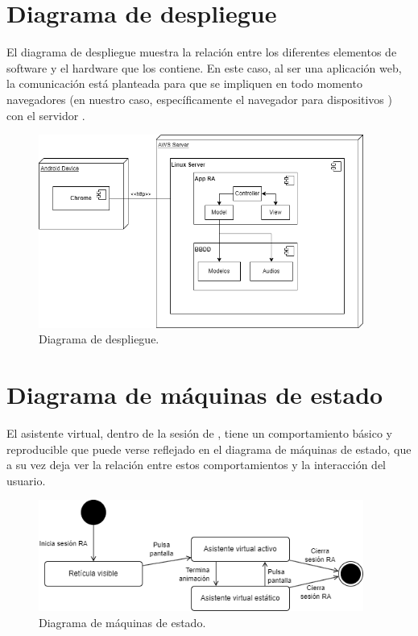 \documentclass{subfiles}
\begin{document}
        \section{Diagrama de despliegue}
        \label{sec:diagrama_de_despliegue}
        
El diagrama de despliegue muestra la relación entre los diferentes elementos de software y el hardware que los contiene. En este caso, al ser una aplicación web, la comunicación está planteada para que se impliquen en todo momento navegadores (en nuestro caso, específicamente el navegador \googlechrome para dispositivos \android) con el servidor \aws.

\begin{figure}[ht]
\centering
\includegraphics[width=0.95\textwidth]{img/analisis_diagrama_de_despliegue.png}
\caption{Diagrama de despliegue.}
\label{fig:analisis_diagrama_de_despliegue}
\end{figure}

\newpage
        \section{Diagrama de máquinas de estado}
        \label{sec:diagrama_de_maquinas_de_estado}
        
El asistente virtual, dentro de la sesión de \ra, tiene un comportamiento básico y reproducible que puede verse reflejado en el diagrama de máquinas de estado, que a su vez deja ver la relación entre estos comportamientos y la interacción del usuario.

\begin{figure}[ht]
\centering
\includegraphics[width=0.95\textwidth]{img/analisis_diagrama_maquinas_de_estado.png}
\caption{Diagrama de máquinas de estado.}
\label{fig:analisis_diagrama_maquinas_de_estado}
\end{figure}
\end{document}
